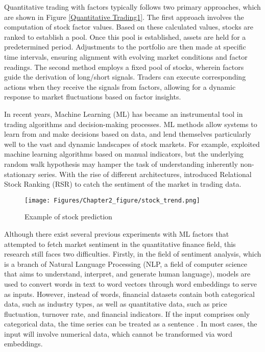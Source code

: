\documentclass[preprint,12pt]{elsarticle}
\begin{document}
Quantitative trading with factors typically follows two primary approaches, which are shown in Figure \ref{Quantitative Trading1}. The first approach involves the computation of stock factor values. Based on these calculated values, stocks are ranked to establish a pool. Once this pool is established, assets are held for a predetermined period. Adjustments to the portfolio are then made at specific time intervals, ensuring alignment with evolving market conditions and factor readings. The second method employs a fixed pool of stocks, wherein factors guide the derivation of long/short signals. Traders can execute corresponding actions when they receive the signals from factors, allowing for a dynamic response to market fluctuations based on factor insights.

In recent years, Machine Learning (ML) has became an instrumental tool in trading algorithms and decision-making processes. ML methods allow systems to learn from and make decisions based on data, and lend themselves particularly well to the vast and dynamic landscapes of stock markets. For example, \citet{nayak2015naive} exploited machine learning algorithms based on manual indicators, but the underlying random walk hypothesis may hamper the task of understanding inherently non-stationary series. With the rise of different architectures, \citet{feng2019temporal} introduced Relational Stock Ranking (RSR) to catch the sentiment of the market in trading data. 

\begin{figure}[t]
\centering
\texttt{[image: Figures/Chapter2\_figure/stock\_trend.png]}
\renewcommand{\figurename}{Figure}
\caption{Example of stock prediction}
\end{figure}

Although there exist several previous experiments with ML factors that attempted to fetch market sentiment in the quantitative finance field, this research still faces two difficulties. Firstly, in the field of sentiment analysis, which is a branch of Natural Language Processing (NLP, a field of computer science that aims to understand, interpret, and generate human language), models are used to convert words in text to word vectors through word embeddings to serve as inputs. However, instead of words, financial datasets contain both categorical data, such as industry types, as well as quantitative data, such as price fluctuation, turnover rate, and financial indicators. If the input comprises only categorical data, the time series can be treated as a sentence \citep{gorishniy2022embeddings}. In most cases, the input will involve numerical data, which cannot be transformed via word embeddings.
\end{document}
